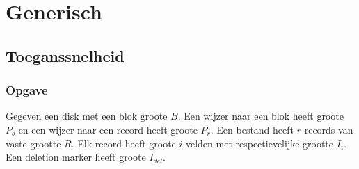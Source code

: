 \documentclass[indexstructuren.tex]{subfiles}
\begin{document}
\chapter{Generisch}
\renewcommand\thesection{V\arabic{section}}
\renewcommand\thesubsection{V\arabic{section}}

\section{Toeganssnelheid}
\subsection*{Opgave}
Gegeven een disk met een blok groote $B$. Een wijzer naar een blok heeft groote $P_b$ en een wijzer naar een record heeft groote $P_r$. Een bestand heeft $r$ records van vaste grootte $R$. Elk record heeft groote $i$ velden met respectievelijke grootte $I_i$. Een deletion marker heeft groote $I_{del}$.
\end{document}
